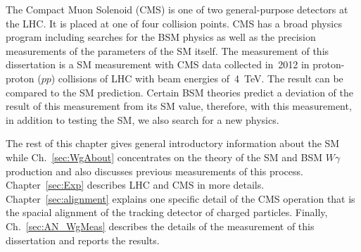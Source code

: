 The Compact Muon Solenoid (CMS) is one of two general-purpose detectors at the LHC. It is placed at one of four collision points. CMS has a broad physics program including searches for the BSM physics as well as the precision measurements of the parameters of the SM itself. The measurement of this dissertation is a SM measurement with CMS data collected in~2012 in proton-proton ($pp$) collisions of LHC with beam energies of~4~TeV. The result can be compared to the SM prediction. Certain BSM theories predict a deviation of the result of this measurement from its SM value, therefore, with this measurement, in addition to testing the SM, we also search for a new physics.


The rest of this chapter gives general introductory information about the SM while Ch.~\ref{sec:WgAbout} concentrates on the theory of the SM and BSM $W\gamma$ production and also discusses previous measurements of this process. Chapter~\ref{sec:Exp} describes LHC and CMS in more details. Chapter~\ref{sec:alignment} explains one specific detail of the CMS operation that is the spacial alignment of the tracking detector of charged particles. Finally, Ch.~\ref{sec:AN_WgMeas} describes the details of the measurement of this dissertation and reports the results. 

%
%
%
%
%
%

